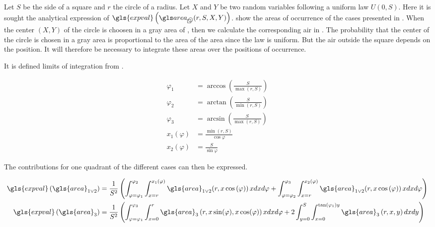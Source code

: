 \begin{appendix}
Let \( S \) be the side of a square and \( r \) the circle of a radius.
Let \( X \) and \( Y \) be two random variables following a uniform law \( U(0, S) \).
Here it is sought the analytical expression of \( \gls{expval} \left( \cirsqr (r, S, X, Y) \right) \).
 show the areas of occurrence of the cases presented in .
When the center \( ( X, Y ) \) of the circle is choosen in a gray area of , then we calculate the corresponding air in .
The probability that the center of the circle is chosen in a gray area is proportional to the area of the area since the law is uniform.
But the air outside the square depends on the position.
It will therefore be necessary to integrate these areas over the positions of occurrence.


\medskip

It is defined limits of integration from .

\begin{align}
\varphi_1 &= \arccos \left( \frac{S}{\max(r, S)} \right) \\
\varphi_2 &= \arctan \left( \frac{S}{\min(r, S)} \right) \\
\varphi_3 &= \arcsin \left( \frac{S}{\max(r, S)} \right) \\
x_1 (\varphi) &= \frac{\min(r, S)}{\cos{\varphi}} \\
x_2 (\varphi) &= \frac{S}{\sin{\varphi}}
\end{align}

\medskip

The contributions for one quadrant of the different cases can then be expressed.

\begin{align}
\gls{expval} \left( \gls{area}_{1 \lor 2} \right) &=
\frac{1}{S^2} \left(
\int_{\varphi = \varphi_1}^{\varphi_2}
\int_{x=r}^{x_1(\varphi)}
\gls{area}_{1 \lor 2} (r, x \cos \left( \varphi) \right)
x dx d\varphi
+
\int_{\varphi = \varphi_2}^{\varphi_3}
\int_{x=r}^{x_2(\varphi)}
\gls{area}_{1 \lor 2} (r, x \cos \left( \varphi) \right)
x dx d\varphi
\right) \\
\gls{expval} \left( \gls{area}_{3} \right) &=
\frac{1}{S^2} \left(
\int_{\varphi = \varphi_1}^{\varphi_3}
\int_{x=0}^{r}
\gls{area}_{3} \left( r, x \sin(\varphi), x \cos(\varphi) \right)
x dx d\varphi
+
2 \int_{y = 0}^{S}
\int_{x=0}^{\tan(\varphi_1)y}
\gls{area}_{3} \left( r, x, y \right)
dx dy
\right)
\end{align}


\end{appendix}
